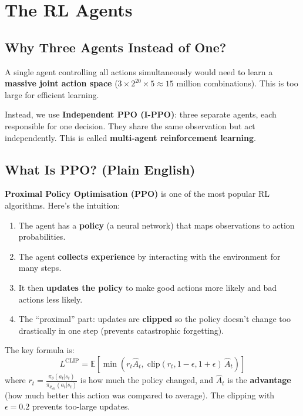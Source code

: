 \documentclass[11pt,a4paper]{article}
\begin{document}
\section{The RL Agents}\label{sec:agents}


\subsection{Why Three Agents Instead of One?}

A single agent controlling all actions simultaneously would need to learn a
\textbf{massive joint action space} ($3 \times 2^{20} \times 5 \approx 15$
million combinations). This is too large for efficient learning.

Instead, we use \textbf{Independent PPO (I-PPO)}: three separate agents, each
responsible for one decision. They share the same observation but act
independently. This is called \textbf{multi-agent reinforcement learning}.

\subsection{What Is PPO? (Plain English)}

\textbf{Proximal Policy Optimisation (PPO)} is one of the most popular RL
algorithms. Here's the intuition:

\begin{enumerate}[leftmargin=2em]
  \item The agent has a \textbf{policy} (a neural network) that maps observations
        to action probabilities.
  \item The agent \textbf{collects experience} by interacting with the environment
        for many steps.
  \item It then \textbf{updates the policy} to make good actions more likely and
        bad actions less likely.
  \item The ``proximal'' part: updates are \textbf{clipped} so the policy doesn't
        change too drastically in one step (prevents catastrophic forgetting).
\end{enumerate}

The key formula is:
\[
  L^{\text{CLIP}} = \mathbb{E}\left[\min\left(
    r_t \hat{A}_t,\;
    \text{clip}(r_t, 1{-}\epsilon, 1{+}\epsilon)\,\hat{A}_t
  \right)\right]
\]
where $r_t = \frac{\pi_\theta(a_t|s_t)}{\pi_{\theta_{\text{old}}}(a_t|s_t)}$ is
how much the policy changed, and $\hat{A}_t$ is the \textbf{advantage} (how much
better this action was compared to average). The clipping with $\epsilon=0.2$
prevents too-large updates.
\end{document}
